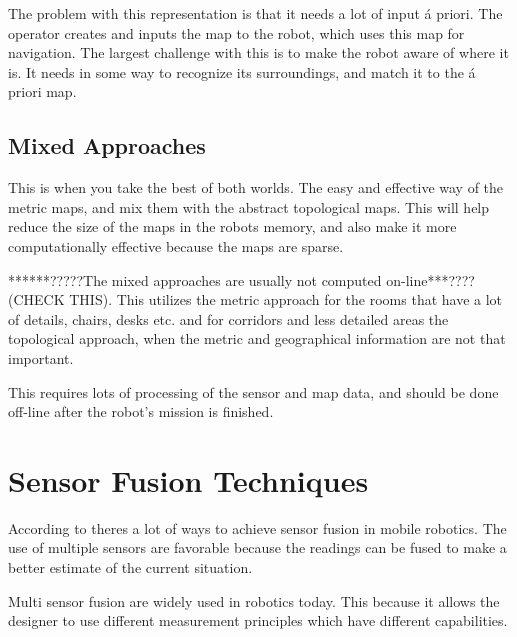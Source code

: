 The problem with this representation is that it needs a lot of input \'a priori. The
operator creates and inputs the map to the robot, which uses this map for navigation. The
largest challenge with this is to make the robot aware of where it is. It needs in some
way to recognize its surroundings, and match it to the \'a priori map.


\subsection{Mixed Approaches}
This is when you take the best of both worlds. The easy and effective way of the metric
maps, and mix them with the abstract topological maps. This will help reduce the size of
the maps in the robots memory, and also make it more computationally effective because the
maps are sparse. 

******?????The mixed approaches are usually not computed on-line***???? (CHECK THIS). This utilizes
the metric approach for the rooms that have a lot of details, chairs, desks etc. and for
corridors and less detailed areas the topological approach, when the metric and
geographical information are not that important. 

This requires lots of processing of the sensor and map data, and should be done off-line
after the robot's mission is finished. 


\section{Sensor Fusion Techniques}
According to \cite{sensor-fusion-mobile-robots} theres a lot of ways to achieve sensor
fusion in mobile robotics. The use of multiple sensors are favorable because the readings
can be fused to make a better estimate of the current situation. 

Multi sensor fusion are widely used in robotics today. This because it allows the designer
to use different measurement principles which have different capabilities. 


